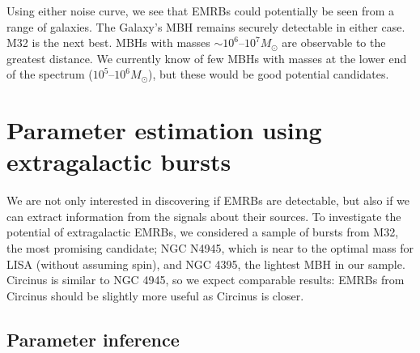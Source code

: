 Using either noise curve, we see that EMRBs could potentially be seen from a range of galaxies. The Galaxy's MBH remains securely detectable in either case. M32 is the next best. MBHs with masses $\sim 10^6$--$10^7 M_\odot$ are observable to the greatest distance. We currently know of few MBHs with masses at the lower end of the spectrum ($10^5$--$10^6 M_\odot$), but these would be good potential candidates.

\section{Parameter estimation using extragalactic bursts}\label{sec:extragal-Res}

We are not only interested in discovering if EMRBs are detectable, but also if we can extract information from the signals about their sources. To investigate the potential of extragalactic EMRBs, we considered a sample of bursts from M32, the most promising candidate; NGC N4945, which is near to the optimal mass for LISA (without assuming spin), and NGC 4395, the lightest MBH in our sample. Circinus is similar to NGC 4945, so we expect comparable results: EMRBs from Circinus should be slightly more useful as Circinus is closer.

\subsection{Parameter inference}


